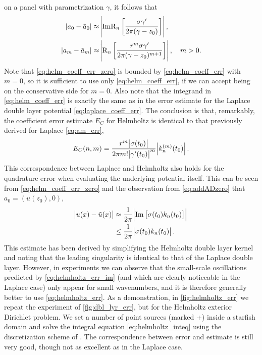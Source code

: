 \documentclass[hidelinks]{siamart1116}
\begin{document}
on a panel with parametrization ${\gamma}$, it follows that
\begin{align}
  \label{eq:helm_coeff_err_zero}
  |{a}_0-\tilde{a}_0| &\approx \abs{{\operatorname{Im}} {\operatorname{R}_{n}}\left[ 
                              \frac{{{\sigma}} {\gamma}'}{ 2\pi ({\gamma}-z_0)}
                              \right]}, \\
  \label{eq:helm_coeff_err}
  |{a}_m-\tilde{a}_m| &\approx \abs{{\operatorname{R}_{n}}\left[ \frac{r^m {{\sigma}} {\gamma}'}{2\pi ({\gamma}-z_0)^{m+1}} \right]}, \quad m>0.
\end{align}
Note that \eqref{eq:helm_coeff_err_zero} is bounded by
\eqref{eq:helm_coeff_err} with $m=0$, so it is sufficient to use only
\eqref{eq:helm_coeff_err}, if we can accept being on the conservative
side for $m=0$. Also note that the integrand in
\eqref{eq:helm_coeff_err} is exactly the same as in the error estimate
for the Laplace double layer potential
\eqref{eq:laplace_coeff_err}. The conclusion is that, remarkably, the
coefficient error estimate ${E_C}$ for Helmholtz is identical to that
previously derived for Laplace \eqref{eq:am_err},
\begin{align}
  {E_C}(n, m) =
  \frac{r^m \abs{{{\sigma}}(t_0)}}
  {2\pi m! \abs{\gamma'(t_0)}^{m}}
  \abs{k_n^{(m)}(t_0)}.
  \label{eq:am_err_helmholtz}
\end{align}
This correspondence between Laplace and Helmholtz also holds for the
quadrature error when evaluating the underlying potential itself. This
can be seen from \eqref{eq:helm_coeff_err_zero} and the observation
from \eqref{eq:addADzero} that $a_0=(u(z_0), 0)$,
\begin{align}
  \abs{u(x) - \tilde u(x)} &\approx
  \frac{1}{2\pi} \abs{{\operatorname{Im}} \left[{{\sigma}}(t_0) k_n(t_0)\right]} 
  \label{eq:helmholtz_err_im} \\
  &\le \frac{1}{2\pi} \abs{{{\sigma}}(t_0) k_n(t_0)}.
  \label{eq:helmholtz_err}
\end{align}
This estimate has been derived by simplifying the Helmholtz double
layer kernel and noting that the leading singularity is identical to
that of the Laplace double layer. However, in experiments we can
observe that the small-scale oscillations predicted by
\eqref{eq:helmholtz_err_im} (and which are clearly noticeable in the
Laplace case) only appear for small wavenumbers, and it is therefore
generally better to use \eqref{eq:helmholtz_err}. As a demonstration,
in \cref{fig:helmholtz_err} we repeat the experiment of
\cref{fig:dbl_lyr_err}, but for the Helmholtz exterior Dirichlet
problem. We set a number of point sources (marked +) inside a starfish
domain and solve the integral equation \eqref{eq:helmholtz_inteq}
using the discretization scheme of \cite{Helsing2015}. The
correspondence between error and estimate is still very good, though
not as excellent as in the Laplace case.
\end{document}
